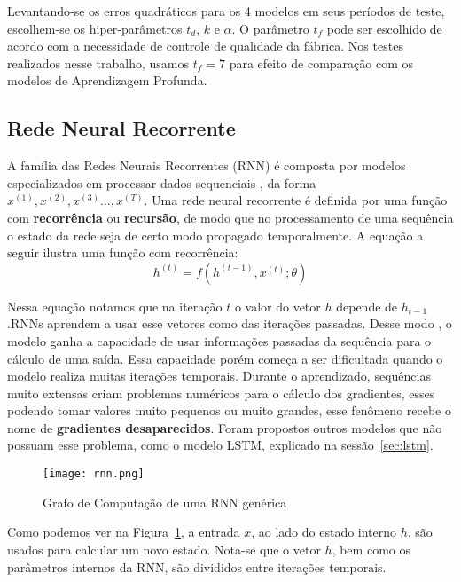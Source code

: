 Levantando-se os erros quadráticos para os 4 modelos em seus períodos de
teste, escolhem-se os hiper-parâmetros $t_d$, $k$ e $\alpha$. O parâmetro $t_f$ pode ser
escolhido de acordo com a necessidade de controle de qualidade da fábrica. Nos
testes realizados nesse trabalho, usamos $t_f=7$ para efeito de comparação com
os modelos de Aprendizagem Profunda. 

\subsection{Rede Neural Recorrente}
% 

A família das Redes Neurais Recorrentes (RNN) é composta por modelos especializados
em processar dados sequenciais \citep{dlbook}, da forma $x^{(1)},x^{(2)} ,x^{(3)}\dots ,x^{(T)}$. Uma rede neural recorrente é definida por uma função com
\textbf{recorrência} ou \textbf{recursão}, de modo que no processamento de uma
sequência o estado da rede seja de certo modo propagado temporalmente.
A equação a seguir ilustra uma função com recorrência: \\

\[h^{(t)} = f(h^{(t-1)},x^{(t)};\theta)\]

Nessa equação notamos que na iteração $t$ o valor do vetor $h$ depende de
$h_{t-1}$.RNNs aprendem a usar esse vetores como
 das iterações passadas. Desse modo , o modelo ganha a capacidade
de usar informações passadas da sequência para o cálculo
de uma saída. Essa capacidade porém começa a ser dificultada quando o modelo
realiza muitas iterações temporais. Durante o aprendizado, sequências muito
extensas criam problemas numéricos para o cálculo dos gradientes, esses podendo
tomar valores muito pequenos ou muito grandes, esse fenômeno recebe o nome de
\textbf{gradientes desaparecidos}. Foram propostos outros modelos
que não possuam esse problema, como o modelo LSTM, explicado na sessão~\ref{sec:lstm}. 

\begin{figure}[H]
\centering
\texttt{[image: rnn.png]}
\caption{Grafo de Computação de uma RNN genérica \citep{dlbook}}
\label{fig:rnngraph}
\end{figure}

Como podemos ver na Figura~\ref{fig:rnngraph}, a entrada $x$, ao lado do estado
interno $h$, são usados para calcular um novo estado. Nota-se que o vetor $h$,
bem como os parâmetros internos da RNN, são divididos entre iterações temporais.
\\

